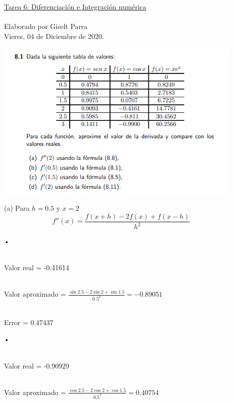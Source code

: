 \documentclass[11pt]{article}
\begin{document}
\begin{center}
 \Large \underline {\\ \\Tarea 6: Diferenciación e Integración numérica}
  \\
  \\
 \small  {Elaborado por Giselt Parra}\\ 
 \footnotesize{Vieres, 04 de Diciembre de 2020.}
\end{center}

\begin{center}
    \includegraphics[keepaspectratio, width=12cm]{S1.png}
    \caption{\\}
\end{center} 


\vspace{0.5cm}
(a) Para $h = 0.5$ y $x=2$
\begin{equation}
  f''(x) = \frac{f(x + h) - 2f(x) + f(x - h)}{h^2} \hspace{1cm} 
\end{equation}

• 

\\Valor real =  -0.41614  

\\ Valor aproximado = $\frac{\sin{2.5} - 2\sin{2} + \sin{1.5}}{0.5^2} = -0.89051$

\\ Error = 0.47437

• 

\\Valor real = -0.90929  

\\ Valor aproximado = $\frac{\cos{2.5} - 2\cos{2} + \cos{1.5}}{0.5^2} = 0.40754$
\end{document}
